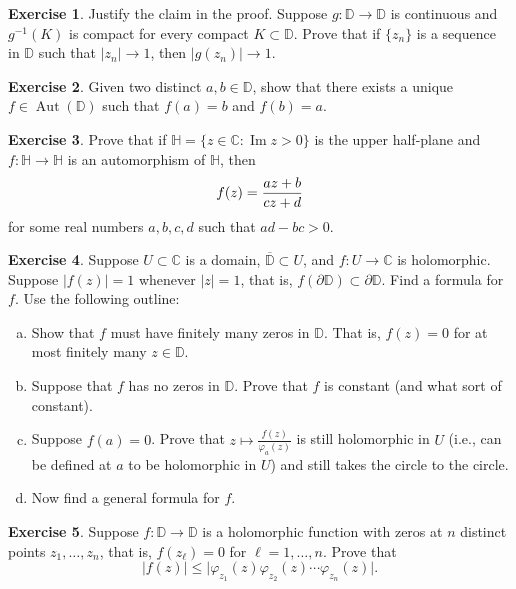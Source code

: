 \documentclass[12pt,openany]{book}
\newcommand{\avoidbreak}{\postdisplaypenalty=100}
\renewcommand{\Im}{\operatorname{Im}}
\newcommand{\Aut}{\operatorname{Aut}}
\newcommand{\sabs}[1]{\lvert {#1} \rvert}
\newcommand{\C}{{\mathbb{C}}}
\newcommand{\D}{{\mathbb{D}}}
\newcommand{\bH}{{\mathbb{H}}}
\theoremstyle{plain}
\theoremstyle{remark}
\theoremstyle{definition}
\newenvironment{exbox}{%
    \def\FrameCommand{\vrule width 1pt \relax\hspace{10pt}}%
    \MakeFramed{\advance\hsize-\width\FrameRestore}%
}{%
    \endMakeFramed
}
\newenvironment{exparts}{%
    \leavevmode\begin{enumerate}[a),noitemsep,topsep=0pt,parsep=0pt,partopsep=0pt]
}{%
    \end{enumerate}
}
\theoremstyle{exercise}
\newtheorem{exercise}{Exercise}[section]
\theoremstyle{example}
\begin{document}
\begin{exbox}
\begin{exercise}
Justify the claim in the proof.  Suppose
$g \colon \D \to \D$ is continuous and $g^{-1}(K)$ is compact
for every compact $K \subset \D$.  Prove that if $\{ z_n \}$ is a sequence
in $\D$ such that $\sabs{z_n} \to 1$, then
$\sabs{g(z_n)} \to 1$.
\end{exercise}

\begin{exercise}
Given two distinct $a,b \in \D$, show that there exists a unique 
$f \in \Aut(\D)$
such that $f(a) = b$ and $f(b) = a$.
\end{exercise}

\begin{exercise}
Prove that if $\bH = \{ z \in \C : \Im z > 0 \}$ is the upper half-plane
and $f \colon \bH \to \bH$ is an automorphism of $\bH$, then
\begin{equation*}
f(z) = \frac{a z +b}{c z + d}
\avoidbreak
\end{equation*}
for some real numbers $a,b,c,d$ such that $ad-bc > 0$.
\end{exercise}

\begin{exercise}
Suppose $U \subset \C$ is a domain, $\overline{\D} \subset U$,
and $f \colon U \to \C$ is holomorphic.
Suppose $\sabs{f(z)}=1$ whenever $\sabs{z}=1$,
that is, $f(\partial \D) \subset \partial \D$.
Find a formula for $f$.  Use the following outline:
\begin{exparts}
\item
Show that $f$ must have finitely many zeros in $\D$.  That is, $f(z) = 0$
for at most finitely many $z \in \D$.
\item
Suppose that $f$ has no zeros in $\D$.  Prove that $f$ is constant
(and what sort of constant).
\item
Suppose $f(a) = 0$.  Prove that
$z \mapsto \frac{f(z)}{\varphi_a(z)}$ is still holomorphic in $U$
(i.e., can be defined at $a$ to be holomorphic in $U$)
and still takes the circle to the circle.
\item
Now find a general formula for $f$.
\end{exparts}
\end{exercise}

\begin{exercise}
Suppose $f \colon \D \to \D$ is a holomorphic function with zeros at
$n$ distinct points
$z_1,\ldots,z_n$, that is, $f(z_\ell) = 0$ for $\ell=1,\ldots,n$.  Prove that
\begin{equation*}
\sabs{f(z)} \leq \sabs{\varphi_{z_1}(z)  
\varphi_{z_2}(z)
\cdots
\varphi_{z_n}(z)} .
\end{equation*}
\end{exercise}


\end{exbox}
\end{document}

